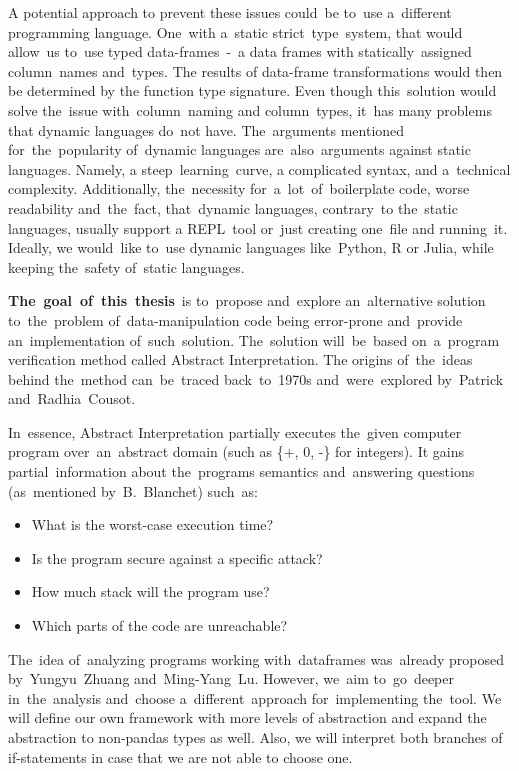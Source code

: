 A potential approach to prevent these issues could~be to~use a~different programming language.
One~with a~static strict~type~system, that would allow~us to~use typed data-frames~-~a data frames with statically~assigned
column~names and~types.
The results of data-frame transformations would then be determined by the function type signature.
Even though this~solution would solve the~issue with~column~naming and column~types, it~has many problems that dynamic
languages do~not have.
The~arguments mentioned for~the~popularity of~dynamic languages are~also~arguments against static languages.
Namely, a steep~learning~curve, a complicated syntax, and a~technical complexity.
Additionally, the~necessity for~a~lot~of~boilerplate code, worse readability and~the~fact, that~dynamic languages,
contrary~to the~static languages, usually support a REPL~tool or~just creating one~file and running~it.
Ideally, we would~like to~use dynamic languages like~Python, R or Julia, while keeping the~safety of~static languages.

\textbf{The~goal~of~this~thesis}~is to~propose and~explore an~alternative solution to~the~problem of~data-manipulation
code being error-prone and~provide an~implementation of~such~solution.
The~solution will~be~based on~a~program verification method called Abstract Interpretation.
The origins of~the~ideas behind the~method can~be~traced back~to~1970s and~were~explored by~Patrick
and~Radhia~Cousot\cite{Cousot:1977:AI}.

In~essence, Abstract Interpretation partially executes the~given computer program over~an~abstract domain
(such as \{+, 0, -\} for integers).
It gains partial~information about the~programs semantics and~answering questions (as~mentioned
by~B.~Blanchet\cite{Blanchet:2002:AI}) such~as:
\begin{itemize}
    \item What is the worst-case execution time?
    \item Is the program secure against a specific attack?
    \item How much stack will the program use?
    \item Which parts of the code are unreachable?
\end{itemize}

The~idea of~analyzing programs working with~dataframes was~already proposed by~Yungyu~Zhuang
and~Ming-Yang~Lu\cite{Zhuang:2022:TypeChecking}.
However, we~aim to~go~deeper in~the~analysis and~choose a~different~approach for~implementing the~tool.
We will define our own framework with more levels of abstraction and expand the abstraction to non-pandas types as well.
Also, we will interpret both branches of if-statements in case that we are not able to choose one.

